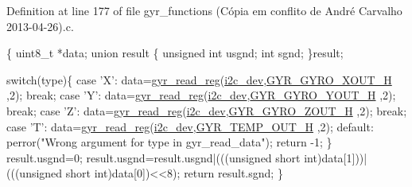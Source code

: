 Definition at line 177 of file gyr\-\_\-functions (\-Cópia em conflito de André Carvalho 2013-\/04-\/26).\-c.


\begin{DoxyCode}
\{
  uint8\_t *data;
  \textcolor{keyword}{union }result
  \{
    \textcolor{keywordtype}{unsigned} \textcolor{keywordtype}{int} usgnd;
    \textcolor{keywordtype}{int} sgnd;
  \}result;

  \textcolor{keywordflow}{switch}(type)\{
    \textcolor{keywordflow}{case} \textcolor{charliteral}{'X'}:
      data=\hyperlink{group__gyr_gad817a3b69d4c3026b7a9b6de32753e7b}{gyr\_read\_reg}(\hyperlink{CommunicationV0_2communication_8c_a7751bd45ac1064efb35adf1f19c25db8}{i2c\_dev},\hyperlink{communication_2imu__regs_8h_a45d3d3c92328dd02072aae7d8cf14ad0}{GYR\_GYRO\_XOUT\_H}
      ,2);
      \textcolor{keywordflow}{break};
    \textcolor{keywordflow}{case} \textcolor{charliteral}{'Y'}:
      data=\hyperlink{group__gyr_gad817a3b69d4c3026b7a9b6de32753e7b}{gyr\_read\_reg}(\hyperlink{CommunicationV0_2communication_8c_a7751bd45ac1064efb35adf1f19c25db8}{i2c\_dev},\hyperlink{communication_2imu__regs_8h_a7664c10b8291231d44694e154c218fab}{GYR\_GYRO\_YOUT\_H}
      ,2);
      \textcolor{keywordflow}{break};
    \textcolor{keywordflow}{case} \textcolor{charliteral}{'Z'}:
      data=\hyperlink{group__gyr_gad817a3b69d4c3026b7a9b6de32753e7b}{gyr\_read\_reg}(\hyperlink{CommunicationV0_2communication_8c_a7751bd45ac1064efb35adf1f19c25db8}{i2c\_dev},\hyperlink{communication_2imu__regs_8h_ae4d2753664f152db1bef259f99975b4c}{GYR\_GYRO\_ZOUT\_H}
      ,2);
      \textcolor{keywordflow}{break};
    \textcolor{keywordflow}{case} \textcolor{charliteral}{'T'}:
      data=\hyperlink{group__gyr_gad817a3b69d4c3026b7a9b6de32753e7b}{gyr\_read\_reg}(\hyperlink{CommunicationV0_2communication_8c_a7751bd45ac1064efb35adf1f19c25db8}{i2c\_dev},\hyperlink{communication_2imu__regs_8h_a7d00eaf1ea076429433ad0c787b48200}{GYR\_TEMP\_OUT\_H}
      ,2);
    \textcolor{keywordflow}{default}:
      perror(\textcolor{stringliteral}{"Wrong argument for type in gyr\_read\_data"});
      \textcolor{keywordflow}{return} -1;
  \}
  result.usgnd=0;
  result.usgnd=result.usgnd|(((\textcolor{keywordtype}{unsigned} \textcolor{keywordtype}{short} int)data[1]))|(((\textcolor{keywordtype}{unsigned} \textcolor{keywordtype}{short} \textcolor{keywordtype}{
      int})data[0])<<8);
  \textcolor{keywordflow}{return} result.sgnd;
\}\end{DoxyCode}
